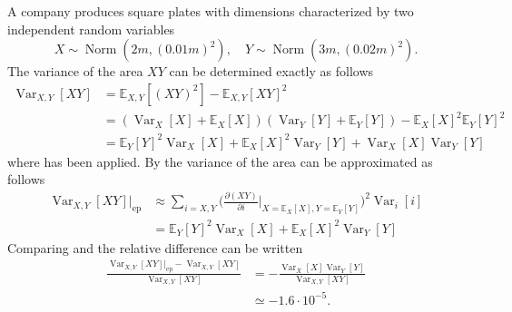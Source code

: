 \begin{example}
	A company produces square plates with dimensions characterized by two independent random variables
	\begin{equation}
		X\sim \operatorname{Norm}(2m,(0.01m)^2), \quad Y\sim \operatorname{Norm}(3m,(0.02m)^2).
	\end{equation} 
	The variance of the area $XY$ can be determined exactly as follows
	\begin{equation}
		\label{eq:var1}
		\begin{split}
			\operatorname{Var}_{X,Y}[XY]&=\mathbb{E}_{X,Y}[(XY)^2]-\mathbb{E}_{X,Y}[XY]^2\\
			&=(\operatorname{Var}_X[X]+\mathbb{E}_X[X])(\operatorname{Var}_Y[Y]+\mathbb{E}_Y[Y])-\mathbb{E}_X[X]^2\mathbb{E}_Y[Y]^2\\
			&=\mathbb{E}_Y[Y]^2\operatorname{Var}_X[X]+\mathbb{E}_X[X]^2\operatorname{Var}_Y[Y]+\operatorname{Var}_X[X]\operatorname{Var}_Y[Y]
		\end{split}
	\end{equation}
	where  has been applied.	By  the variance of the area can be approximated as follows
	\begin{equation}
		\label{eq:var2}
		\begin{split}
			\operatorname{Var}_{X,Y}[XY]|_{\text{ep}}&\approx\sum_{i = X,Y} \bigg( \frac{\partial (XY)}{\partial i}\bigg|_{X = \mathbb{E}_X[X],Y = \mathbb{E}_Y[Y]}  \bigg)^2\operatorname{Var}_i[i]\\
			&=\mathbb{E}_Y[Y]^2\operatorname{Var}_X[X]+\mathbb{E}_X[X]^2\operatorname{Var}_Y[Y]
		\end{split}
	\end{equation}
	Comparing  and  the relative difference can be written
	\begin{equation}
		\begin{split}
			\frac{\operatorname{Var}_{X,Y}[XY]|_{\text{ep}}-\operatorname{Var}_{X,Y}[XY]}{\operatorname{Var}_{X,Y}[XY]} &= -\frac{\operatorname{Var}_X[X]\operatorname{Var}_Y[Y]}{\operatorname{Var}_{X,Y}[XY]}\\
			& \simeq -1.6\cdot 10^{-5}.
		\end{split}
	\end{equation}
	
\end{example}

